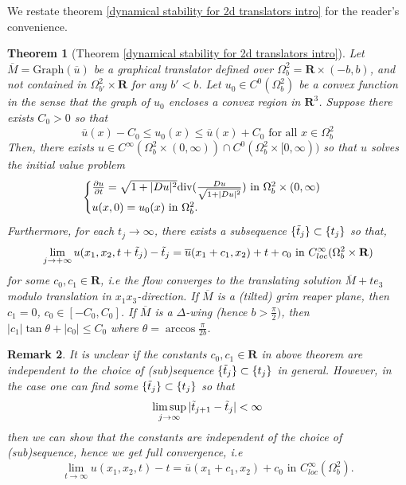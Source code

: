 \documentclass[pdflatex,sn-mathphys-num]{sn-jnl}%
\newtheorem{theorem}{Theorem}[section]
\newtheorem{remark}[theorem]{Remark}
\begin{document}
We restate theorem \ref{dynamical stability for 2d translators intro} for the reader's convenience. 
\begin{theorem}[Theorem \ref{dynamical stability for 2d translators intro}]\label{dynamical stability of 2d translators}
Let $\overline{M} = \text{Graph}(\overline{u})$ be a graphical translator defined over $\Omega^2_b = \mathbf{R}\times (-b, b)$, and not contained in $\Omega^2_{b'}\times \mathbf{R}$ for any $b' < b$. Let $u_0 \in C^0(\Omega^2_b)$ be a convex function in the sense that the graph of $u_0$ encloses a convex region in $\mathbf{R}^3$. Suppose there exists $C_0 > 0$ so that 
\begin{equation}\label{C0 closeness 2d}
    \overline{u}(x) - C_0 \leq u_0(x) \leq \overline{u}(x) + C_0 \text{ for all }x \in \Omega^2_b
\end{equation}
Then, there exists $u \in C^{\infty}(\Omega^2_b \times (0, \infty)) \cap C^0(\Omega^2_b\times [0, \infty))$ so that $u$ solves the initial value problem
\begin{equation}
\begin{cases}
    \frac{\partial u}{\partial t} = \sqrt{1 + |Du|^2}\textit{\emph{div}}(\frac{Du}{\sqrt{1 + |Du|^2}}) \text{ in }\Omega^2_b \times (0, \infty) \\
    u(x,0) = u_0(x) \text{ in }\Omega^2_b.
\end{cases}
\end{equation}
Furthermore, for each $t_j \to \infty$, there exists a subsequence $\{\Tilde{t}_j\} \subset \{t_j\}$ so that, 
$$\lim_{j \to + \infty}u(x_1,x_2,t + \Tilde{t}_j) -\Tilde{t}_j  = \overline{u}(x_1 + c_1, x_2) + t+c_0 \text{ in }C^{\infty}_{loc}(\Omega^2_b \times \mathbf{R})$$
for some $c_0, c_1 \in \mathbf{R}$, i.e the flow converges to the translating solution $\overline{M} + te_3$ modulo translation in $x_1x_3$-direction. If $\overline{M}$ is a (tilted) grim reaper plane, then $c_1 = 0$, $c_0 \in [-C_0, C_0]$. If $\overline{M}$ is a $\Delta$-wing (hence $b > \frac{\pi}{2})$, then $|c_1|\tan\theta + |c_0| \leq C_0$ where $\theta = \arccos\frac{\pi}{2b}$. 
\end{theorem}
\begin{remark}\label{independence of constants 2d translators remark}
    It is unclear if the constants $c_0,c_1 \in \mathbf{R}$ in above theorem are independent to the choice of (sub)sequence $\{\Tilde{t}_j\} \subset \{t_j\}$ in general. However, in the case one can find some $\{\Tilde{t}_j\} \subset \{t_j\}$ so that 
    \begin{equation}
        \limsup_{j \to \infty}|\Tilde{t}_{j+1} - \Tilde{t}_j| < \infty
    \end{equation}
    then we can show that the constants are independent of the choice of (sub)sequence, hence we get full convergence, i.e
    \begin{equation}
        \lim_{t \to \infty}u(x_1, x_2, t) - t = \overline{u}(x_1 + c_1, x_2) + c_0 \text{ in }C^{\infty}_{loc}(\Omega^2_b).
    \end{equation}
\end{remark}
\end{document}
